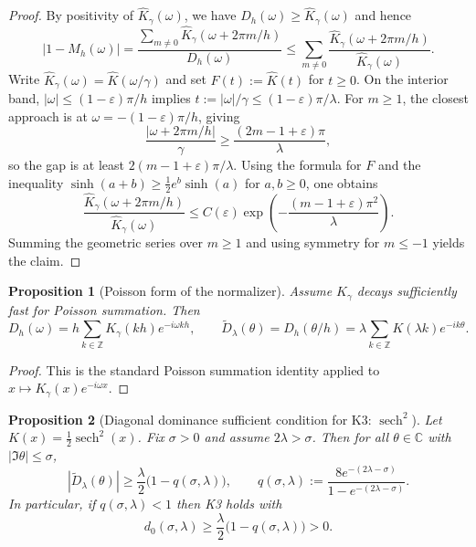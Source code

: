 \documentclass[11pt]{article}
\newtheorem{proposition}{Proposition}
\newcommand{\Z}{\mathbb{Z}}
\newcommand{\wh}[1]{\widehat{#1}}
\newcommand{\sech}{\operatorname{sech}}
\begin{document}
\begin{proof}
By positivity of $\wh K_\gamma(\omega)$, we have $D_h(\omega)\ge \wh K_\gamma(\omega)$ and hence
\[
|1-M_h(\omega)|=
\frac{\sum_{m\ne 0}\wh K_\gamma(\omega+2\pi m/h)}{D_h(\omega)}
\le
\sum_{m\ne 0}\frac{\wh K_\gamma(\omega+2\pi m/h)}{\wh K_\gamma(\omega)}.
\]
Write $\wh K_\gamma(\omega)=\wh K(\omega/\gamma)$ and set $F(t):=\wh K(t)$ for $t\ge 0$. On the interior band, $|\omega|\le (1-\varepsilon)\pi/h$ implies $t:=|\omega|/\gamma\le (1-\varepsilon)\pi/\lambda$. For $m\ge 1$, the closest approach is at $\omega=-(1-\varepsilon)\pi/h$, giving
\[
\frac{|\omega+2\pi m/h|}{\gamma}\ge \frac{(2m-1+\varepsilon)\pi}{\lambda},
\]
so the gap is at least $2(m-1+\varepsilon)\pi/\lambda$. Using the formula for $F$ and the inequality $\sinh(a+b)\ge \tfrac12 e^b\sinh(a)$ for $a,b\ge 0$, one obtains
\[
\frac{\wh K_\gamma(\omega+2\pi m/h)}{\wh K_\gamma(\omega)}
\le
C(\varepsilon)\exp\!\left(-\frac{(m-1+\varepsilon)\pi^2}{\lambda}\right).
\]
Summing the geometric series over $m\ge 1$ and using symmetry for $m\le -1$ yields the claim.
\end{proof}

\begin{proposition}[Poisson form of the normalizer]
\label{prop:poisson}
Assume $K_\gamma$ decays sufficiently fast for Poisson summation. Then
\begin{equation}
D_h(\omega)=h\sum_{k\in\Z}K_\gamma(kh)e^{-i\omega kh},
\qquad
\widetilde D_\lambda(\theta)=D_h(\theta/h)=\lambda\sum_{k\in\Z}K(\lambda k)e^{-ik\theta}.
\label{eq:poisson-normalizer}
\end{equation}
\end{proposition}

\begin{proof}
This is the standard Poisson summation identity applied to $x\mapsto K_\gamma(x)e^{-i\omega x}$.
\end{proof}

\begin{proposition}[Diagonal dominance sufficient condition for K3: $\sech^2$]
Let $K(x)=\tfrac12\sech^2(x)$. Fix $\sigma>0$ and assume $2\lambda>\sigma$. Then for all $\theta\in\mathbb C$ with $|\Im\theta|\le \sigma$,
\begin{equation}
|\widetilde D_\lambda(\theta)|
\ge
\frac{\lambda}{2}\bigl(1-q(\sigma,\lambda)\bigr),
\qquad
q(\sigma,\lambda):=\frac{8e^{-(2\lambda-\sigma)}}{1-e^{-(2\lambda-\sigma)}}.
\label{eq:diag-dom}
\end{equation}
In particular, if $q(\sigma,\lambda)<1$ then K3 holds with
\begin{equation}
d_0(\sigma,\lambda)\ge \frac{\lambda}{2}\bigl(1-q(\sigma,\lambda)\bigr)>0.
\label{eq:d0-lower}
\end{equation}
\end{proposition}
\end{document}
